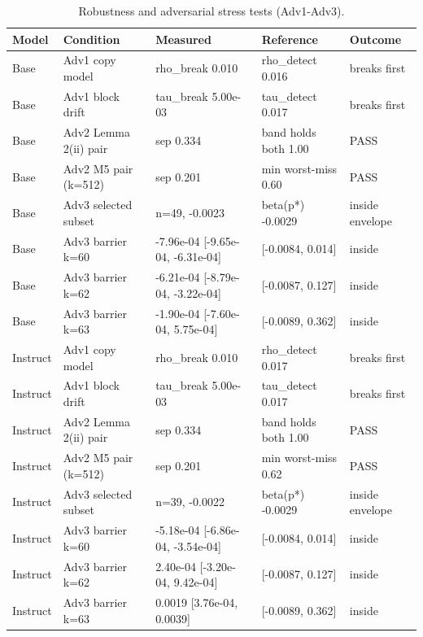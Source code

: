 \begin{table}[t]
\centering
\small
\begin{tabular}{lp{1.15in}p{1.45in}p{1.15in}p{0.85in}}
\toprule
Model & Condition & Measured & Reference & Outcome \\
\midrule
Base & Adv1 copy model & rho\_break 0.010 & rho\_detect 0.016 & breaks first \\
Base & Adv1 block drift & tau\_break 5.00e-03 & tau\_detect 0.017 & breaks first \\
Base & Adv2 Lemma 2(ii) pair & sep 0.334 & band holds both 1.00 & PASS \\
Base & Adv2 M5 pair (k=512) & sep 0.201 & min worst-miss 0.60 & PASS \\
Base & Adv3 selected subset & n=49, -0.0023 & beta(p*) -0.0029 & inside envelope \\
Base & Adv3 barrier k=60 & -7.96e-04 [-9.65e-04, -6.31e-04] & [-0.0084, 0.014] & inside \\
Base & Adv3 barrier k=62 & -6.21e-04 [-8.79e-04, -3.22e-04] & [-0.0087, 0.127] & inside \\
Base & Adv3 barrier k=63 & -1.90e-04 [-7.60e-04, 5.75e-04] & [-0.0089, 0.362] & inside \\
Instruct & Adv1 copy model & rho\_break 0.010 & rho\_detect 0.017 & breaks first \\
Instruct & Adv1 block drift & tau\_break 5.00e-03 & tau\_detect 0.017 & breaks first \\
Instruct & Adv2 Lemma 2(ii) pair & sep 0.334 & band holds both 1.00 & PASS \\
Instruct & Adv2 M5 pair (k=512) & sep 0.201 & min worst-miss 0.62 & PASS \\
Instruct & Adv3 selected subset & n=39, -0.0022 & beta(p*) -0.0029 & inside envelope \\
Instruct & Adv3 barrier k=60 & -5.18e-04 [-6.86e-04, -3.54e-04] & [-0.0084, 0.014] & inside \\
Instruct & Adv3 barrier k=62 & 2.40e-04 [-3.20e-04, 9.42e-04] & [-0.0087, 0.127] & inside \\
Instruct & Adv3 barrier k=63 & 0.0019 [3.76e-04, 0.0039] & [-0.0089, 0.362] & inside \\
\bottomrule
\end{tabular}
\caption{Robustness and adversarial stress tests (Adv1-Adv3).}
\label{tab:T6_robustness_adversarial}
\end{table}
